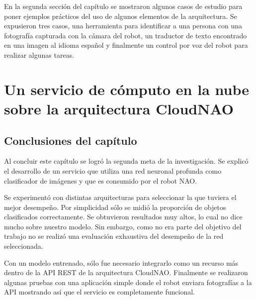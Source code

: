 \documentclass[letterpaper,12pt,spanish]{report}
\begin{document}
En la segunda sección del capítulo
se mostraron algunos casos de estudio para poner ejemplos
prácticos del uso de algunos elementos de la arquitectura.
Se expusieron tres casos, una herramienta para
identificar a una persona con una
fotografía capturada con la cámara
del robot, un traductor de texto
encontrado en una imagen
al idioma español y finalmente 
un control por voz del robot
para realizar algunas tareas.




\chapter{Un servicio de cómputo en la nube sobre la arquitectura CloudNAO}
\label{\detokenize{chapter_three:un-servicio-de-computo-en-la-nube-sobre-la-arquitectura-cloudnao}}
\label{\detokenize{chapter_three::doc}}






\section*{Conclusiones del capítulo}
Al concluir este capítulo se logró
la segunda meta de la investigación.
Se explicó el desarrollo de un servicio que
utiliza una red neuronal profunda
como clasificador de imágenes y
que es consumido por el robot NAO.


Se experimentó con distintas
arquitecturas para seleccionar la
que tuviera el mejor desempeño. Por 
simplicidad sólo se midió la 
proporción de objetos clasificados 
correctamente. Se obtuvieron 
resultados muy altos, lo cual no
dice mucho sobre nuestro modelo. 
Sin embargo, como no era parte del objetivo
del trabajo no se realizó una evaluación
exhaustiva del desempeño de la
red seleccionada.

Con un modelo entrenado, sólo fue necesario 
integrarlo como un recurso más dentro
de la API REST de la arquitectura CloudNAO.
Finalmente se realizaron algunas pruebas
con una aplicación simple donde el robot
enviara fotografías a la API mostrando así
que el servicio es completamente funcional.
\end{document}

